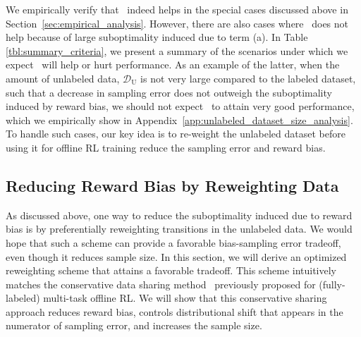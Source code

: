 We empirically verify that \uds\ indeed helps in the special cases discussed above in Section~\ref{sec:empirical_analysis}. However, there are also cases where \uds\ does not help because of large suboptimality induced due to term (a). In Table \ref{tbl:summary_criteria}, we present a summary of the scenarios under which we expect \uds\ will help or hurt performance.
As an example of the latter, when the amount of unlabeled data, $\mathcal{D}_\mathrm{U}$ is not very large compared to the labeled dataset, such that a decrease in sampling error does not outweigh the suboptimality induced by reward bias, we should not expect \uds\ to attain very good performance, which we empirically show in Appendix~\ref{app:unlabeled_dataset_size_analysis}. To handle such cases, our key idea is to re-weight the unlabeled dataset before using it for offline RL training reduce the sampling error and reward bias.

\vspace{-0.05cm}
\subsection{Reducing Reward Bias by Reweighting Data}
\label{sec:rebalancing}
\vspace{-0.05cm}
As discussed above, one way to reduce the suboptimality induced due to reward bias is by preferentially reweighting transitions in the unlabeled data. We would hope that such a scheme can provide a favorable bias-sampling error tradeoff, even though it reduces sample size. In this section, we will derive an optimized reweighting scheme that attains a favorable tradeoff. 
This scheme intuitively matches the conservative data sharing method~\citet{yu2021conservative} previously proposed for (fully-labeled) multi-task offline RL. We will show that this conservative sharing approach reduces reward bias, controls distributional shift that appears in the numerator of sampling error, and increases the sample size.   

